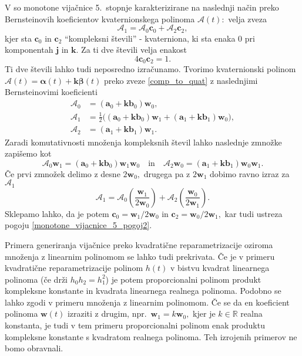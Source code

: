\documentclass[12pt,a4paper,twoside]{article}
\theoremstyle{definition} %
\theoremstyle{plain} %
\numberwithin{equation}{section}  %
\newcommand{\R}{\mathbb R}
\newcommand{\aV}{\mathbf{a}}
\newcommand{\bV}{\mathbf{b}}
\newcommand{\cV}{\mathbf{c}}
\newcommand{\jV}{\mathbf{j}}
\newcommand{\kV}{\mathbf{k}}
\newcommand{\wV}{\mathbf{w}}
\newcommand{\AQ}{\mathcal{A}}
\newcommand{\balpha}{\boldsymbol \alpha}
\newcommand{\bbeta}{\boldsymbol \beta}
\begin{document}
V \cite{faroukietal2004} so monotone vijačnice 5.\ stopnje karakterizirane na naslednji način preko Bernsteinovih koeficientov kvaternionskega polinoma $\AQ(t):$ velja zveza
\begin{equation}
	\label{monotone_vijacnice_5_pogoj}
	\AQ_1=\AQ_0\cV_0+\AQ_2\cV_2,
\end{equation}
kjer sta $\cV_0$ in $\cV_2$ ``kompleksni števili'' - kvaterniona, ki sta enaka 0 pri komponentah $\jV$ in $\kV.$ Za ti dve števili velja enakost
\begin{equation}
	\label{monotone_vijacnice_5_pogoj2}
	4\cV_0\cV_2=1.
\end{equation}
Ti dve števili lahko tudi neposredno izračunamo. Tvorimo kvaternionski polinom $\AQ(t)=\balpha(t)+\kV\bbeta(t)$ preko zveze \eqref{comp_to_quat} z naslednjimi Bernsteinovimi koeficienti
\begin{align*}
	\AQ_0&=(\aV_0+\kV\bV_0)\wV_0,\\
	\AQ_1&=\frac{1}{2}\big((\aV_0+\kV\bV_0)\wV_1+(\aV_1+\kV\bV_1)\wV_0\big),\\
	\AQ_2&=(\aV_1+\kV\bV_1)\wV_1.
\end{align*}
Zaradi komutativnosti množenja kompleksnih števil lahko naslednje zmnožke zapišemo kot
\begin{equation*}
	\AQ_0\wV_1=(\aV_0+\kV\bV_0)\wV_1\wV_0\quad\text{in}\quad\AQ_2\wV_0=(\aV_1+\kV\bV_1)\wV_0\wV_1.
\end{equation*}
Če prvi zmnožek delimo z desne $2\wV_0,$ drugega pa z $2\wV_1$ dobimo ravno izraz za $\AQ_1$
\begin{equation*}
	\AQ_1=\AQ_0\left(\frac{\wV_1}{2\wV_0}\right)+\AQ_2\left(\frac{\wV_0}{2\wV_1}\right).
\end{equation*}
Sklepamo lahko, da je potem $\cV_0=\wV_1/2\wV_0$ in $\cV_2=\wV_0/2\wV_1,$ kar tudi ustreza pogoju \eqref{monotone_vijacnice_5_pogoj2}.

Primera generiranja vijačnice preko kvadratične reparametrizacije oziroma množenja z linearnim polinomom se lahko tudi prekrivata. Če je v primeru kvadratične reparametrizacije polinom $h(t)$ v bistvu kvadrat linearnega polinoma (če drži $h_0h_2=h_1^2$) je potem proporcionalni polinom produkt kompleksne konstante in kvadrata linearnega realnega polinoma. Podobno se lahko zgodi v primeru množenja z linearnim polinomom. Če se da en koeficient polinoma $\wV(t)$ izraziti z drugim, npr.\ $\wV_1=k\wV_0,$ kjer je $k\in\R$ realna konstanta, je tudi v tem primeru proporcionalni polinom enak produktu kompleksne konstante s kvadratom realnega polinoma. Teh izrojenih primerov ne bomo obravnali.
\end{document}
